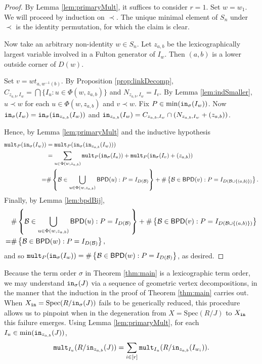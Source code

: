 \documentclass[12pt,reqno]{amsart}
\newtheorem{Main Conjecture}[theorem]{Main Conjecture}
\theoremstyle{remark}
\theoremstyle{plain}
\newcommand{\init}{{\tt in}}
\newcommand{\mult}{{\tt mult}}
\newcommand{\bpd}{{\sf BPD}}
\newcommand{\spec}{{\mbox{Spec}}}
\begin{document}
\begin{proof}
By Lemma \ref{lem:primaryMult}, it suffices to consider $r=1$.  Set $w = w_1$.  We will proceed by induction on $\prec$.  The unique minimal element of $S_n$ under $\prec$ is the identity permutation, for which the claim is clear.

Now take an arbitrary non-identity $w \in S_n$.  Let $z_{a,b}$ be the lexicographically largest variable involved in a Fulton generator of $I_w$.  Then $(a,b)$ is a lower outside corner of $D(w)$.  

Set $v = wt_{a,w^{-1}(b)}$.   By Proposition \ref{prop:linkDecomp}, $C_{z_{a,b},I_w} = \bigcap\{I_u : u \in \Phi(w,z_{a,b})\}$ and $N_{z_{a,b},I_w} = I_v$.  By Lemma \ref{lem:indSmaller}, $u \prec w$ for each $u \in \Phi(w,z_{a,b})$ and $v\prec w$.   Fix $P \in \min(\init_\sigma(I_w))$.  Now $\init_\sigma(I_w) = \init_\sigma(\init_{z_{a,b}}(I_w))$ and $\init_{z_{a,b}}(I_w) = C_{z_{a,b},I_w} \cap (N_{z_{a,b},I_w}+(z_{a,b}))$.

Hence, by  Lemma \ref{lem:primaryMult} and the inductive hypothesis  \begin{align*}
\mult_P(\init_\sigma(I_w)) &= \mult_P(\init_\sigma(\init_{z_{a,b}}(I_w)))\\
& = \sum_{u \in \Phi(w,z_{a,b})} \mult_P(\init_\sigma(I_u)) + \mult_P(\init_\sigma(I_v)+(z_{a,b}))\\
 = &\#\left\{\mathcal{B} \in \bigcup_{u \in \Phi(w,z_{a,b})} \bpd(u): P = I_{D(\mathcal{B})}\right\}+\#\left\{\mathcal{B} \in \bpd(v): P = I_{D(\mathcal{B} \cup \{(a,b)\})}\right\}.
\end{align*}  
Finally, by Lemma \ref{lem:bpdBij}, \begin{align*}
&\#\left\{\mathcal{B} \in \bigcup_{u \in \Phi(w,z_{a,b})} \bpd(u): P = I_{D(\mathcal{B})}\right\}+\#\left\{\mathcal{B} \in \bpd(v): P = I_{D(\mathcal{B} \cup \{(a,b)\})}\right\}\\
 = & \#\left\{\mathcal{B} \in \bpd(w) : P = I_{D(\mathcal{B})} \right\},
\end{align*} and so $\mult_P(\init_\sigma(I_w)) = \#\left\{\mathcal{B} \in \bpd(w) : P = I_{D(\mathcal{B})} \right\}$, as desired.
\end{proof}

Because the term order $\sigma$ in Theorem \ref{thm:main} is a lexicographic term order, we may understand $\init_\sigma(J)$ via a sequence of geometric vertex decompositions, in the manner that the induction in the proof of Theorem \ref{thm:main} carries out.  When $X_{\init} = \spec(R/\init_\sigma(J))$ fails to be generically reduced, this procedure allows us to pinpoint when in the degeneration from $X = \spec(R/J)$ to $X_{\init}$ this failure emerges. Using Lemma \ref{lem:primaryMult}, for each $I_u \in \min(\init_{z_{a,b}}(J))$, \[
\mult_{I_u}(R/\init_{z_{a,b}}(J)) = \sum_{i \in [r]} \mult_{I_u}(R/\init_{z_{a,b}}(I_{w_i})).
\]
\end{document}
